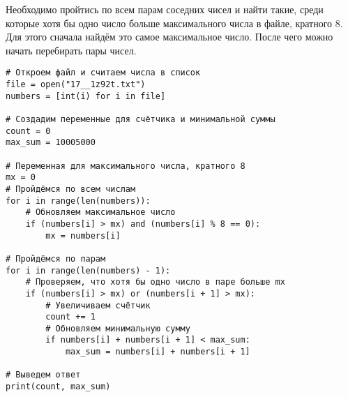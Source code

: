 \documentclass[14pt,a4paper]{article}
\begin{document}
Необходимо пройтись по всем парам соседних чисел и найти такие, среди
которые хотя бы одно число больше максимального числа в файле,
кратного 8. Для этого сначала найдём это самое максимальное число.
После чего можно начать перебирать пары чисел.

\begin{verbatim}
# Откроем файл и считаем числа в список
file = open("17__1z92t.txt")
numbers = [int(i) for i in file]

# Создадим переменные для счётчика и минимальной суммы
count = 0
max_sum = 10005000

# Переменная для максимального числа, кратного 8
mx = 0
# Пройдёмся по всем числам
for i in range(len(numbers)):
    # Обновляем максимальное число
    if (numbers[i] > mx) and (numbers[i] % 8 == 0):
        mx = numbers[i]

# Пройдёмся по парам
for i in range(len(numbers) - 1):
    # Проверяем, что хотя бы одно число в паре больше mx
    if (numbers[i] > mx) or (numbers[i + 1] > mx):
        # Увеличиваем счётчик
        count += 1
        # Обновляем минимальную сумму
        if numbers[i] + numbers[i + 1] < max_sum:
            max_sum = numbers[i] + numbers[i + 1]

# Выведем ответ
print(count, max_sum)
\end{verbatim}
\end{document}
